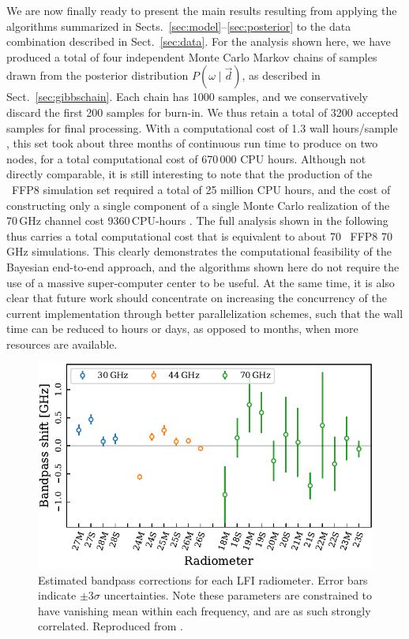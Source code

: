 \documentclass[twocolumn]{aa}
\renewcommand{\d}[0]{\vec{d}}
\begin{document}
We are now finally ready to present the main results resulting from
applying the algorithms summarized in
Sects.~\ref{sec:model}--\ref{sec:posterior} to the data combination
described in Sect.~\ref{sec:data}. For the analysis shown here, we
have produced a total of four independent Monte Carlo Markov chains of
samples drawn from the posterior distribution $P(\omega\mid\d)$, as
described in Sect.~\ref{sec:gibbschain}. Each chain has 1000 samples,
and we conservatively discard the first 200 samples for burn-in. We
thus retain a total of 3200 accepted samples for final
processing. With a computational cost of 1.3 wall hours/sample
\citep{bp03}, this set took about three months of continuous run time
to produce on two nodes, for a total computational cost of 670\,000
CPU hours. Although not directly comparable, it is still interesting
to note that the production of the \Planck\ FFP8 simulation set
required a total of 25 million CPU hours, and the cost of constructing
only a single component of a single Monte Carlo realization of the
70\,GHz channel cost 9360\,CPU-hours \citep{planck2014-a14}. The full
analysis shown in the following thus carries a total computational
cost that is equivalent to about 70 \Planck\ FFP8 70\,GHz
simulations. This clearly demonstrates the computational feasibility
of the Bayesian end-to-end approach, and the algorithms shown here do
not require the use of a massive super-computer center to be
useful. At the same time, it is also clear that future work should
concentrate on increasing the concurrency of the current
implementation through better parallelization schemes, such that the
wall time can be reduced to hours or days, as opposed to months, when
more resources are available.

\begin{figure}[t]
  \center
  \includegraphics[width=\linewidth]{figs/bpshifts_BP10tune.pdf}
  \caption{Estimated bandpass corrections for each LFI radiometer. Error bars indicate $\pm3\sigma$ uncertainties. Note these parameters are constrained to have vanishing mean within each frequency, and are as such strongly correlated. Reproduced from \citet{bp09}. }\label{fig:bpshift}
\end{figure}
\end{document}
